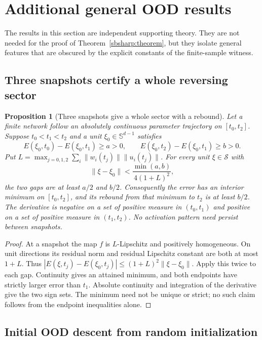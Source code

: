\documentclass[10pt]{article}
\newtheorem{proposition}[theorem]{Proposition}
\theoremstyle{remark}\newtheorem{remark}[theorem]{Remark}
\begin{document}
\section{Additional general OOD results}
\label{app:general-theory}

The results in this section are independent supporting theory. They are not
needed for the proof of Theorem~\ref{sbsharp:theorem}, but they isolate
general features that are obscured by the explicit constants of the
finite-sample witness.

\subsection{Three snapshots certify a whole reversing sector}

\begin{proposition}[Three snapshots give a whole sector with a rebound]
\label{sbaudit:secants}
Let a finite network follow an absolutely continuous parameter trajectory
on $[t_0,t_2]$. Suppose $t_0<t_1<t_2$ and a unit $\xi_0\in\mathbb S^{d-1}$
satisfies
\begin{equation}\label{sbaudit:two-gaps}
 E(\xi_0,t_0)-E(\xi_0,t_1)\ge a>0,\qquad
 E(\xi_0,t_2)-E(\xi_0,t_1)\ge b>0.
\end{equation}
Put $L=\max_{j=0,1,2}\sum_i\|w_i(t_j)\|\|u_i(t_j)\|$.
For every unit $\xi\in\mathcal S$ with
\[
 \|\xi-\xi_0\|<\frac{\min(a,b)}{4(1+L)^2},
\]
the two gaps are at least $a/2$ and $b/2$. Consequently the error has an
interior minimum on $[t_0,t_2]$, and its rebound from that minimum to $t_2$
is at least $b/2$. The derivative is negative on a set of positive measure
in $(t_0,t_1)$ and positive on a set of positive measure in $(t_1,t_2)$.
No activation pattern need persist between snapshots.
\end{proposition}
\begin{proof}
At a snapshot the map $f$ is $L$-Lipschitz and positively homogeneous.
On unit directions its residual norm and residual Lipschitz constant are
both at most $1+L$. Thus
$|E(\xi,t_j)-E(\xi_0,t_j)|\le(1+L)^2\|\xi-\xi_0\|$.
Apply this twice to each gap. Continuity gives an attained minimum,
and both endpoints have strictly larger error than $t_1$. Absolute
continuity and integration of the derivative give the two sign sets.
The minimum need not be unique or strict; no such claim follows from
the endpoint inequalities alone.
\end{proof}

\subsection{Initial OOD descent from random initialization}
\label{app:initial-descent}
\end{document}
